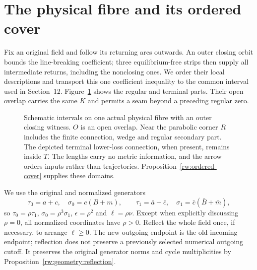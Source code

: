 \section{The physical fibre and its ordered cover}
\label{rw:physical-fibre}

Fix an original field and follow its returning arcs outwards. An outer
closing orbit bounds the line-breaking coefficient; three equilibrium-free
strips then supply all intermediate returns, including the nonclosing
ones. We order their local descriptions and transport this one coefficient
inequality to the common interval used in Section~12.
Figure~\ref{rw:physical:interval-scheme} shows the regular and terminal
parts. Their open overlap carries the same $K$ and permits a seam beyond
a preceding regular zero.

\begin{figure}[htbp]
\centering
{}
\caption{Schematic intervals on one actual physical fibre with an outer
closing witness. $O$ is an open overlap. Near the parabolic corner $R$
includes the finite connection, wedge and regular secondary part.
The depicted terminal lower-loss connection, when present, remains
inside $T$. The lengths
carry no metric information, and the arrow orders inputs rather than
trajectories. Proposition~\ref{rw:ordered-cover} supplies these domains.}
\label{rw:physical:interval-scheme}
\end{figure}

We use the original and normalized generators
\[
 \tau_0=a+c,\quad \sigma_0=c(B+m),\qquad
 \tau_1=\bar a+\bar c,\quad
 \sigma_1=\bar c(\bar B+\bar m),
\]
so $\tau_0=\rho\tau_1$, $\sigma_0=\rho^3\sigma_1$,
$\epsilon=\rho^2$ and $\ell=\rho\nu$. Except when explicitly
discussing $\rho=0$, all normalized coordinates have $\rho>0$.
Reflect the whole field once, if necessary, to arrange $\ell\ge0$.
The new outgoing endpoint is the old incoming endpoint; reflection
does not preserve a previously selected numerical outgoing cutoff.
It preserves the original generator norms and cycle multiplicities
by Proposition~\ref{rw:geometry:reflection}.





